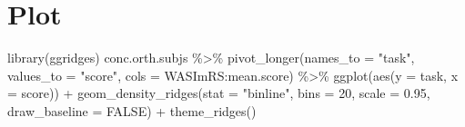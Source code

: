 \documentclass[
  letterpaper,
  DIV=11,
  numbers=noendperiod]{scrreprt}
\newenvironment{Shaded}{\begin{snugshade}}{\end{snugshade}}
\newcommand{\AttributeTok}[1]{\textcolor[rgb]{0.40,0.45,0.13}{#1}}
\newcommand{\ConstantTok}[1]{\textcolor[rgb]{0.56,0.35,0.01}{#1}}
\newcommand{\DecValTok}[1]{\textcolor[rgb]{0.68,0.00,0.00}{#1}}
\newcommand{\FloatTok}[1]{\textcolor[rgb]{0.68,0.00,0.00}{#1}}
\newcommand{\FunctionTok}[1]{\textcolor[rgb]{0.28,0.35,0.67}{#1}}
\newcommand{\NormalTok}[1]{\textcolor[rgb]{0.00,0.23,0.31}{#1}}
\newcommand{\SpecialCharTok}[1]{\textcolor[rgb]{0.37,0.37,0.37}{#1}}
\newcommand{\StringTok}[1]{\textcolor[rgb]{0.13,0.47,0.30}{#1}}
\begin{document}
\section{Plot}

\begin{Shaded}
\begin{Highlighting}[numbers=left,,]
\FunctionTok{library}\NormalTok{(ggridges)}
\NormalTok{conc.orth.subjs }\SpecialCharTok{\%\textgreater{}\%}
  \FunctionTok{pivot\_longer}\NormalTok{(}\AttributeTok{names\_to =} \StringTok{"task"}\NormalTok{, }\AttributeTok{values\_to =} \StringTok{"score"}\NormalTok{, }\AttributeTok{cols =}\NormalTok{ WASImRS}\SpecialCharTok{:}\NormalTok{mean.score) }\SpecialCharTok{\%\textgreater{}\%} 
  \FunctionTok{ggplot}\NormalTok{(}\FunctionTok{aes}\NormalTok{(}\AttributeTok{y =}\NormalTok{ task, }\AttributeTok{x =}\NormalTok{ score)) }\SpecialCharTok{+}
  \FunctionTok{geom\_density\_ridges}\NormalTok{(}\AttributeTok{stat =} \StringTok{"binline"}\NormalTok{, }\AttributeTok{bins =} \DecValTok{20}\NormalTok{, }\AttributeTok{scale =} \FloatTok{0.95}\NormalTok{, }\AttributeTok{draw\_baseline =} \ConstantTok{FALSE}\NormalTok{) }\SpecialCharTok{+}
  \FunctionTok{theme\_ridges}\NormalTok{()}
\end{Highlighting}
\end{Shaded}
\end{document}
